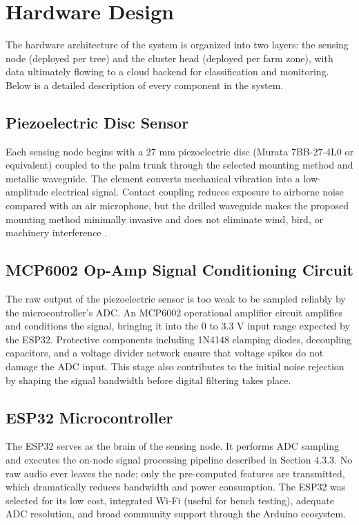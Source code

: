 \documentclass[12pt,a4paper,oneside]{memoir}
\begin{document}
\section{Hardware Design}

The hardware architecture of the system is organized into two layers: the sensing node (deployed per tree) and the cluster head (deployed per farm zone), with data ultimately flowing to a cloud backend for classification and monitoring. Below is a detailed description of every component in the system.

\subsection{Piezoelectric Disc Sensor}

Each sensing node begins with a 27 mm piezoelectric disc (Murata 7BB-27-4L0 or equivalent) coupled to the palm trunk through the selected mounting method and metallic waveguide. The element converts mechanical vibration into a low-amplitude electrical signal. Contact coupling reduces exposure to airborne noise compared with an air microphone, but the drilled waveguide makes the proposed mounting method minimally invasive and does not eliminate wind, bird, or machinery interference \cite{pinhas2008,karar2022}.

\subsection{MCP6002 Op-Amp Signal Conditioning Circuit}

The raw output of the piezoelectric sensor is too weak to be sampled reliably by the microcontroller's ADC. An MCP6002 operational amplifier circuit amplifies and conditions the signal, bringing it into the 0 to 3.3 V input range expected by the ESP32. Protective components including 1N4148 clamping diodes, decoupling capacitors, and a voltage divider network ensure that voltage spikes do not damage the ADC input. This stage also contributes to the initial noise rejection by shaping the signal bandwidth before digital filtering takes place.

\subsection{ESP32 Microcontroller}

The ESP32 serves as the brain of the sensing node. It performs ADC sampling and executes the on-node signal processing pipeline described in Section 4.3.3. No raw audio ever leaves the node; only the pre-computed features are transmitted, which dramatically reduces bandwidth and power consumption. The ESP32 was selected for its low cost, integrated Wi-Fi (useful for bench testing), adequate ADC resolution, and broad community support through the Arduino ecosystem.
\end{document}
